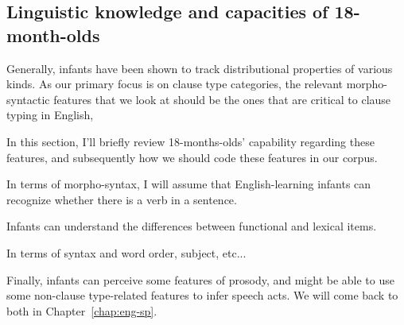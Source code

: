 \subsection{Linguistic knowledge and capacities of 18-month-olds}
\label{sec:engcl:bg:assumptions}

Generally, infants have been shown to track distributional properties of various kinds. As our primary focus is on clause type categories, the relevant morpho-syntactic features that we look at should be the ones that are critical to clause typing in English, %

In this section, I'll briefly review 18-months-olds' capability regarding these features, and subsequently how we should code these features in our corpus. 

In terms of morpho-syntax, I will assume that English-learning infants can recognize whether there is a verb in a sentence. 

Infants can understand the differences between functional and lexical items. 

In terms of syntax and word order, subject, etc...

Finally, infants can perceive some features of prosody, and might be able to use some non-clause type-related features to infer speech acts. We will come back to both in Chapter~\ref{chap:eng-sp}.



